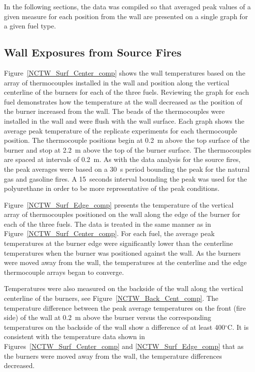 \documentclass[twoside]{uocthesis}
\begin{document}
{In the following sections, the data was compiled so that averaged peak values of a given measure for each position from the wall are presented on a single graph for a given fuel type.

\subsection{Wall Exposures from Source Fires}

Figure~\ref{NCTW_Surf_Center_comp} shows the wall temperatures based on the array of thermocouples installed in the wall and position along the vertical centerline of the burners for each of the three fuels. Reviewing the graph for each fuel demonstrates how the temperature at the wall decreased as the position of the burner increased from the wall. The beads of the thermocouples were installed in the wall and were flush with the wall surface. Each graph shows the average peak temperature of the replicate experiments for each thermocouple position.  The thermocouple positions begin at 0.2~m above the top surface of the burner and stop at 2.2~m above the top of the burner surface. The thermocouples are spaced at intervals of 0.2~m. As with the data analysis for the source fires, the peak averages were based on a 30~s period bounding the peak for the natural gas and gasoline fires.  A 15~seconds interval bounding the peak was used for the polyurethane in order to be more representative of the peak conditions.

Figure~\ref{NCTW_Surf_Edge_comp} presents the temperature of the vertical array of thermocouples positioned on the wall along the edge of the burner for each of the three fuels.  The data is treated in the same manner as in Figure~\ref{NCTW_Surf_Center_comp}.  For each fuel, the average peak temperatures at the burner edge were significantly lower than the centerline temperatures when the burner was positioned against the wall.  As the burners were moved away from the wall, the temperatures at the centerline and the edge thermocouple arrays began to converge.

Temperatures were also measured on the backside of the wall along the vertical centerline of the burners, see Figure~\ref{NCTW_Back_Cent_comp}. The temperature difference between the peak average temperatures on the front (fire side) of the wall at 0.2~m above the burner versus the corresponding temperatures on the backside of the wall show a difference of at least 400$^\circ$C.  It is consistent with the temperature data shown in Figures~\ref{NCTW_Surf_Center_comp} and \ref{NCTW_Surf_Edge_comp} that as the burners were moved away from the wall, the temperature differences decreased.

}
\end{document}
